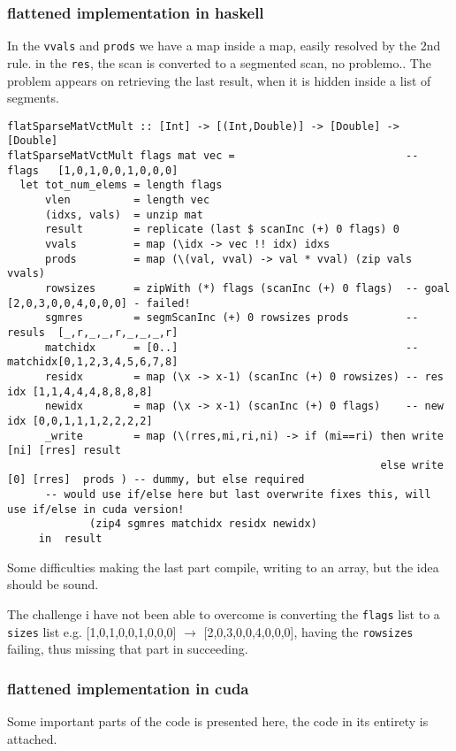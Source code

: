 \documentclass[a4paper,10pt]{article}
\begin{document}
\subsubsection{flattened implementation in haskell}
In the \texttt{vvals} and \texttt{prods} we have a map inside a map, easily resolved by the 2nd rule.
in the \texttt{res}, the scan is converted to a segmented scan, no problemo..
The problem appears on retrieving the last result, when it is hidden inside a list of segments.
\begin{verbatim}
flatSparseMatVctMult :: [Int] -> [(Int,Double)] -> [Double] -> [Double]
flatSparseMatVctMult flags mat vec =                           -- flags   [1,0,1,0,0,1,0,0,0]
  let tot_num_elems = length flags
      vlen          = length vec
      (idxs, vals)  = unzip mat
      result        = replicate (last $ scanInc (+) 0 flags) 0
      vvals         = map (\idx -> vec !! idx) idxs
      prods         = map (\(val, vval) -> val * vval) (zip vals vvals)
      rowsizes      = zipWith (*) flags (scanInc (+) 0 flags)  -- goal    [2,0,3,0,0,4,0,0,0] - failed!
      sgmres        = segmScanInc (+) 0 rowsizes prods         -- resuls  [_,r,_,_,r,_,_,_,r]
      matchidx      = [0..]                                    -- matchidx[0,1,2,3,4,5,6,7,8]
      residx        = map (\x -> x-1) (scanInc (+) 0 rowsizes) -- res idx [1,1,4,4,4,8,8,8,8]
      newidx        = map (\x -> x-1) (scanInc (+) 0 flags)    -- new idx [0,0,1,1,1,2,2,2,2]
      _write        = map (\(rres,mi,ri,ni) -> if (mi==ri) then write [ni] [rres] result
                                                           else write  [0] [rres]  prods ) -- dummy, but else required
      -- would use if/else here but last overwrite fixes this, will use if/else in cuda version!
             (zip4 sgmres matchidx residx newidx)
     in  result
\end{verbatim}
Some difficulties making the last part compile, writing to an array, but the idea should be sound.

The challenge i have not been able to overcome is converting the \texttt{flags} list to a \texttt{sizes} list e.g. [1,0,1,0,0,1,0,0,0] $\rightarrow$ [2,0,3,0,0,4,0,0,0], having the \texttt{rowsizes} failing, thus missing that part in succeeding.

\newpage
\subsubsection{flattened implementation in cuda}
Some important parts of the code is presented here, the code in its entirety is attached.
\end{document}
